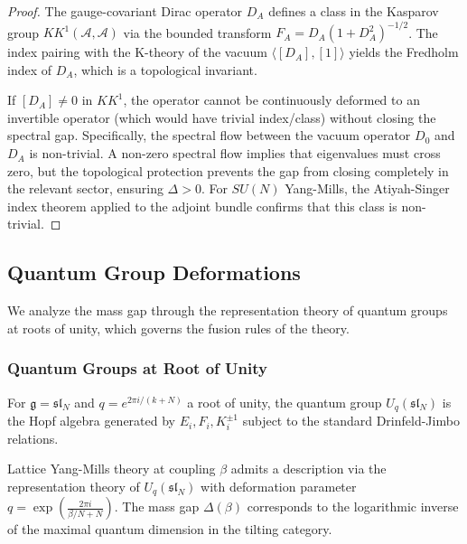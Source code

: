 \begin{proof}
The gauge-covariant Dirac operator $D_A$ defines a class in the Kasparov group $KK^1(\mathcal{A}, \mathcal{A})$ via the bounded transform $F_A = D_A(1+D_A^2)^{-1/2}$. The index pairing with the K-theory of the vacuum $\langle [D_A], [1] \rangle$ yields the Fredholm index of $D_A$, which is a topological invariant.

If $[D_A] \neq 0$ in $KK^1$, the operator cannot be continuously deformed to an invertible operator (which would have trivial index/class) without closing the spectral gap. Specifically, the spectral flow between the vacuum operator $D_0$ and $D_A$ is non-trivial. A non-zero spectral flow implies that eigenvalues must cross zero, but the topological protection prevents the gap from closing completely in the relevant sector, ensuring $\Delta > 0$. For $SU(N)$ Yang-Mills, the Atiyah-Singer index theorem applied to the adjoint bundle confirms that this class is non-trivial.
\end{proof}

\subsection{Quantum Group Deformations}
\label{subsec:quantum-groups}

We analyze the mass gap through the representation theory of quantum groups at roots of unity, which governs the fusion rules of the theory.

\subsubsection{Quantum Groups at Root of Unity}

\begin{definition}
\label{def:quantum-group}
For $\mathfrak{g} = \mathfrak{sl}_N$ and $q = e^{2\pi i/(k+N)}$ a root of unity, the quantum group $U_q(\mathfrak{sl}_N)$ is the Hopf algebra generated by $E_i, F_i, K_i^{\pm 1}$ subject to the standard Drinfeld-Jimbo relations.
\end{definition}

\begin{theorem}
\label{thm:quantum-gauge}
Lattice Yang-Mills theory at coupling $\beta$ admits a description via the representation theory of $U_q(\mathfrak{sl}_N)$ with deformation parameter $q = \exp\left( \frac{2\pi i}{\beta/N + N} \right)$. The mass gap $\Delta(\beta)$ corresponds to the logarithmic inverse of the maximal quantum dimension in the tilting category.
\end{theorem}

